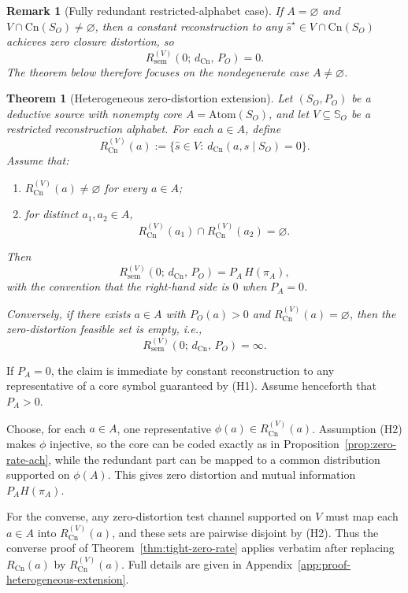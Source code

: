 \documentclass[journal,onecolumn]{IEEEtran}
\makeatletter
\newcommand{\Atom}{\text{Atom}}
\newcommand{\Cn}{\text{Cn}}
\newtheorem{theorem}{Theorem}[section]
\newtheorem{remark}{Remark}[section]
\numberwithin{equation}{section}
\renewenvironment{proof}[1][\proofname]{\par
  \pushQED{\qed}%
  \normalfont \topsep6\p@\@plus6\p@\relax
  \trivlist
  \item[\hskip\labelsep
        \itshape
    #1\@addpunct{.}]\ignorespaces
}{%
  \popQED\endtrivlist\@endpefalse
}
\makeatother
\begin{document}
\begin{remark}[Fully redundant restricted-alphabet case]
\label{rem:fully-redundant-restricted}
If \(A=\varnothing\) and \(V\cap\Cn(S_O)\neq\varnothing\), then a
constant reconstruction to any \(\hat s^\star\in V\cap\Cn(S_O)\)
achieves zero closure distortion, so
\[
  R_{\mathrm{sem}}^{(V)}(0;\,d_{\Cn},\,P_O)=0.
\]
The theorem below therefore focuses on the nondegenerate case
\(A\neq\varnothing\).
\end{remark}

\begin{theorem}[Heterogeneous zero-distortion extension]
\label{thm:heterogeneous-extension}
Let \((S_O,P_O)\) be a deductive source with nonempty core
\(A=\Atom(S_O)\), and let \(V\subseteq\mathbb{S}_O\) be a
restricted reconstruction alphabet.
For each \(a\in A\), define
\[
  R_{\Cn}^{(V)}(a)
  :=
  \{\hat s\in V:\ d_{\Cn}(a,\hat s\mid S_O)=0\}.
\]
Assume that:
\begin{enumerate}[label=\textup{(H\arabic*)}]
  \item \(R_{\Cn}^{(V)}(a)\neq\varnothing\) for every \(a\in A\);
  \item for distinct \(a_1,a_2\in A\),
        \[
          R_{\Cn}^{(V)}(a_1)\cap R_{\Cn}^{(V)}(a_2)=\varnothing.
        \]
\end{enumerate}
Then
\begin{equation}\label{eq:heterogeneous-zero-rate}
  R_{\mathrm{sem}}^{(V)}(0;\,d_{\Cn},\,P_O)
  =
  P_A\,H(\pi_A),
\end{equation}
with the convention that the right-hand side is \(0\) when
\(P_A=0\).

Conversely, if there exists \(a\in A\) with \(P_O(a)>0\) and
\(R_{\Cn}^{(V)}(a)=\varnothing\), then the zero-distortion feasible
set is empty, i.e.,
\[
  R_{\mathrm{sem}}^{(V)}(0;\,d_{\Cn},\,P_O)=\infty.
\]
\end{theorem}

\begin{proof}[Proof sketch]
If \(P_A=0\), the claim is immediate by constant reconstruction to any
representative of a core symbol guaranteed by \textup{(H1)}. Assume
henceforth that \(P_A>0\).

Choose, for each \(a\in A\), one representative
\(\phi(a)\in R_{\Cn}^{(V)}(a)\).
Assumption \textup{(H2)} makes \(\phi\) injective, so the core can be
coded exactly as in Proposition~\ref{prop:zero-rate-ach}, while the
redundant part can be mapped to a common distribution supported on
\(\phi(A)\). This gives zero distortion and mutual information
\(P_AH(\pi_A)\).

For the converse, any zero-distortion test channel supported on \(V\)
must map each \(a\in A\) into \(R_{\Cn}^{(V)}(a)\), and these sets are
pairwise disjoint by \textup{(H2)}. Thus the converse proof of
Theorem~\ref{thm:tight-zero-rate} applies verbatim after replacing
\(R_{\Cn}(a)\) by \(R_{\Cn}^{(V)}(a)\). Full details are given in
Appendix~\ref{app:proof-heterogeneous-extension}.
\end{proof}
\end{document}
